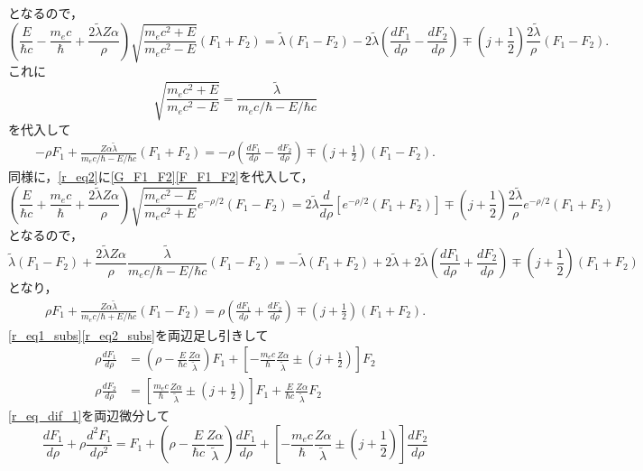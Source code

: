 となるので，
\[\left(\frac{E}{\hbar c} - \frac{m_ec}{\hbar} + \frac{2\tilde{\lambda}Z\alpha}{\rho}\right)\sqrt{\frac{m_ec^2 + E}{m_ec^2 - E}}(F_1 + F_2)=\tilde{\lambda}(F_1 - F_2) - 2\tilde{\lambda}\left(\frac{dF_1}{d\rho} - \frac{dF_2}{d\rho}\right)\mp\left(j + \frac{1}{2}\right)\frac{2\tilde{\lambda}}{\rho}(F_1 - F_2).\]
これに
\[\sqrt{\frac{m_ec^2 + E}{m_ec^2 - E}}=\frac{\tilde{\lambda}}{m_ec/\hbar - E/\hbar c}\]
を代入して
\begin{align}
   - \rho F_1 + \frac{Z\alpha\tilde{\lambda}}{m_ec/\hbar - E/\hbar c}(F_1 + F_2)= - \rho\left(\frac{dF_1}{d\rho} - \frac{dF_2}{d\rho}\right)\mp\left(j + \frac{1}{2}\right)(F_1 - F_2).\label{r_eq1_subs}
\end{align}
同様に，\eqref{r_eq2}に\eqref{G_F1_F2}\eqref{F_F1_F2}を代入して，
\[ \left(\frac{E}{\hbar c} + \frac{m_ec}{\hbar} + \frac{2\tilde{\lambda}Z\alpha}{\rho}\right)\sqrt{\frac{m_ec^2 - E}{m_ec^2 + E}}e^{ - \rho/2}(F_1 - F_2)= 2\tilde{\lambda}\frac{d}{d\rho}\left[e^{ - \rho/2}(F_1 + F_2)\right]\mp\left(j + \frac{1}{2}\right)\frac{2\tilde{\lambda}}{\rho}e^{ - \rho/2}(F_1 + F_2)\]
となるので，
\[\tilde{\lambda}(F_1 - F_2) + \frac{2\tilde{\lambda}Z\alpha}{\rho}\frac{\tilde{\lambda}}{m_ec/\hbar - E/\hbar c}(F_1 - F_2)= - \tilde{\lambda}(F_1 + F_2) + 2\tilde{\lambda} + 2\tilde{\lambda}\left(\frac{dF_1}{d\rho} + \frac{dF_2}{d\rho}\right)\mp\left(j + \frac{1}{2}\right)(F_1 + F_2)\]
となり，
\begin{align}
  \rho F_1 + \frac{Z\alpha\tilde{\lambda}}{m_ec/\hbar + E/\hbar c}(F_1 - F_2)=\rho\left(\frac{dF_1}{d\rho} + \frac{dF_2}{d\rho}\right)\mp\left(j + \frac{1}{2}\right)(F_1 + F_2).\label{r_eq2_subs}
\end{align}
\eqref{r_eq1_subs}\eqref{r_eq2_subs}を両辺足し引きして
\begin{align}
  \rho\frac{dF_1}{d\rho} &= \left(\rho - \frac{E}{\hbar c}\frac{Z\alpha}{\tilde{\lambda}}\right)F_1 + \left[ - \frac{m_ec}{\hbar}\frac{Z\alpha}{\tilde{\lambda}}\pm\left(j + \frac{1}{2}\right)\right]F_2\label{r_eq_dif_1}\\
  \rho\frac{dF_2}{d\rho} &= \left[\frac{m_ec}{\hbar}\frac{Z\alpha}{\tilde{\lambda}}\pm\left(j + \frac{1}{2}\right)\right]F_1  +  \frac{E}{\hbar c}\frac{Z\alpha}{\tilde{\lambda}}F_2\label{r_eq_dif_2}
\end{align}
\eqref{r_eq_dif_1}を両辺微分して
\[\frac{dF_1}{d\rho} + \rho\frac{d^2F_1}{d\rho^2}=F_1 + \left(\rho - \frac{E}{\hbar c}\frac{Z\alpha}{\tilde{\lambda}}\right)\frac{dF_1}{d\rho} + \left[ - \frac{m_ec}{\hbar}\frac{Z\alpha}{\tilde{\lambda}}\pm\left(j + \frac{1}{2}\right)\right]\frac{dF_2}{d\rho}\]
